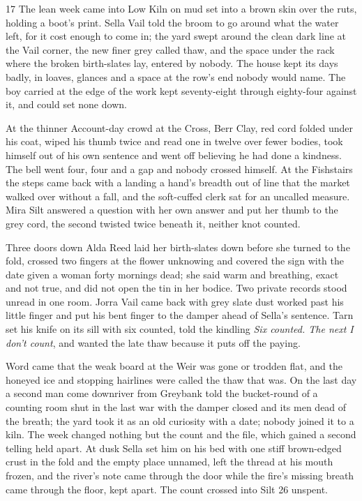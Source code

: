 \begin{CRchronicle}{17}
The lean week came into Low Kiln on mud set into a brown skin over the ruts, holding a boot’s print. Sella Vail told the broom to go around what the water left, for it cost enough to come in; the yard swept around the clean dark line at the Vail corner, the new finer grey called thaw, and the space under the rack where the broken birth-slates lay, entered by nobody. The house kept its days badly, in loaves, glances and a space at the row’s end nobody would name. The boy carried at the edge of the work kept seventy-eight through eighty-four against it, and could set none down.

At the thinner Account-day crowd at the Cross, Berr Clay, red cord folded under his coat, wiped his thumb twice and read one in twelve over fewer bodies, took himself out of his own sentence and went off believing he had done a kindness. The bell went four, four and a gap and nobody crossed himself. At the Fishstairs the steps came back with a landing a hand’s breadth out of line that the market walked over without a fall, and the soft-cuffed clerk sat for an uncalled measure. Mira Silt answered a question with her own answer and put her thumb to the grey cord, the second twisted twice beneath it, neither knot counted.

Three doors down Alda Reed laid her birth-slates down before she turned to the fold, crossed two fingers at the flower unknowing and covered the sign with the date given a woman forty mornings dead; she said warm and breathing, exact and not true, and did not open the tin in her bodice. Two private records stood unread in one room. Jorra Vail came back with grey slate dust worked past his little finger and put his bent finger to the damper ahead of Sella’s sentence. Tarn set his knife on its sill with six counted, told the kindling \emph{Six counted. The next I don’t count}, and wanted the late thaw because it puts off the paying.

Word came that the weak board at the Weir was gone or trodden flat, and the honeyed ice and stopping hairlines were called the thaw that was. On the last day a second man come downriver from Greybank told the bucket-round of a counting room shut in the last war with the damper closed and its men dead of the breath; the yard took it as an old curiosity with a date; nobody joined it to a kiln. The week changed nothing but the count and the file, which gained a second telling held apart. At dusk Sella set him on his bed with one stiff brown-edged crust in the fold and the empty place unnamed, left the thread at his mouth frozen, and the river’s note came through the door while the fire’s missing breath came through the floor, kept apart. The count crossed into Silt 26 unspent.
\end{CRchronicle}

